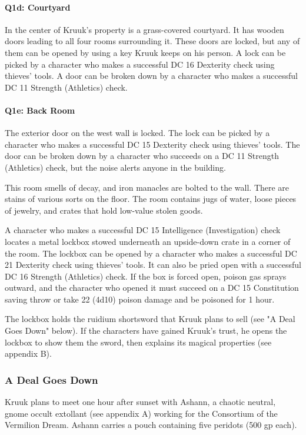 \documentclass[10pt,a4paper,twoside,twocolumn,openany,nodeprecatedcode]{dndbook}
\begin{document}
\paragraph{Q1d: Courtyard}
In the center of Kruuk's property is a grass-covered courtyard. It has wooden doors leading to all four rooms surrounding it. These doors are locked, but any of them can be opened by using a key Kruuk keeps on his person. A lock can be picked by a character who makes a successful DC 16 Dexterity check using thieves' tools. A door can be broken down by a character who makes a successful DC 11 Strength (Athletics) check.

\paragraph{Q1e: Back Room}
The exterior door on the west wall is locked. The lock can be picked by a character who makes a successful DC 15 Dexterity check using thieves' tools. The door can be broken down by a character who succeeds on a DC 11 Strength (Athletics) check, but the noise alerts anyone in the building.

This room smells of decay, and iron manacles are bolted to the wall. There are stains of various sorts on the floor. The room contains jugs of water, loose pieces of jewelry, and crates that hold low-value stolen goods.

A character who makes a successful DC 15 Intelligence (Investigation) check locates a metal lockbox stowed underneath an upside-down crate in a corner of the room. The lockbox can be opened by a character who makes a successful DC 21 Dexterity check using thieves' tools. It can also be pried open with a successful DC 16 Strength (Athletics) check. If the box is forced open, poison gas sprays outward, and the character who opened it must succeed on a DC 15 Constitution saving throw or take 22 (4d10) poison damage and be poisoned for 1 hour.

The lockbox holds the ruidium shortsword that Kruuk plans to sell (see "A Deal Goes Down" below). If the characters have gained Kruuk's trust, he opens the lockbox to show them the sword, then explains its magical properties (see appendix B).

\subsubsection{A Deal Goes Down}
Kruuk plans to meet one hour after sunset with Ashann, a chaotic neutral, gnome occult extollant (see appendix A) working for the Consortium of the Vermilion Dream. Ashann carries a pouch containing five peridots (500 gp each).
\end{document}
